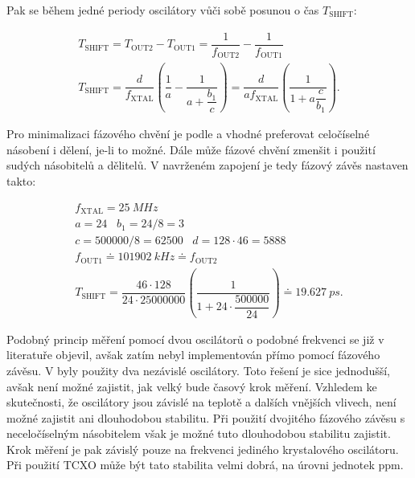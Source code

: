 Pak se během jedné periody oscilátory vůči sobě posunou o čas $T_\textrm{SHIFT}$:

\begin{equation}
\begin{gathered}
T_\mathrm{SHIFT}=T_\mathrm{OUT2}-T_\mathrm{OUT1}=\dfrac{1}{f_\mathrm{OUT2}} - \dfrac{1}{f_\mathrm{OUT1}} \\
T_\mathrm{SHIFT}=\dfrac{d}{f_\mathrm{XTAL}} \left(\dfrac{1}{a} - \dfrac{1}{a+\dfrac{b_1}{c}}\right) = \dfrac{d}{a f_\mathrm{XTAL}} \left(\dfrac{1}{1+a\dfrac{c}{b_1}}\right).
\end{gathered}
\label{equation_tshift}
\end{equation}

Pro minimalizaci fázového chvění je podle \cite{Si5351datasheet} a \cite{Si5351applicationnote} vhodné preferovat celočíselné násobení i dělení, je-li to možné. Dále může fázové chvění zmenšit i použití sudých násobitelů a dělitelů. V navrženém zapojení je tedy fázový závěs nastaven takto:

\begin{equation}
\begin{gathered}
f_\mathrm{XTAL}=\SI{25}{MHz} \\
a=24 \;\;\; b_1=24/8=3 \\
c=500000/8=62500 \;\;\; d=128 \cdot 46=5888 \\
f_\mathrm{OUT1} \doteq \SI{101902}{kHz} \doteq f_\mathrm{OUT2} \\
T_\mathrm{SHIFT} = \dfrac{46 \cdot 128}{24 \cdot 25000000} \left(\dfrac{1}{1+24 \cdot \dfrac{500000}{24}}\right) \doteq \SI{19.627}{ps}.
\end{gathered}
\end{equation}

Podobný princip měření pomocí dvou oscilátorů o podobné frekvenci se již v literatuře objevil, avšak zatím nebyl implementován přímo pomocí fázového závěsu. V \cite{vernierreflectometer} byly použity dva nezávislé oscilátory. Toto řešení je sice jednodušší, avšak není možné zajistit, jak velký bude časový krok měření. Vzhledem ke skutečnosti, že oscilátory jsou závislé na teplotě a dalších vnějších vlivech, není možné zajistit ani dlouhodobou stabilitu. Při použití dvojitého fázového závěsu s neceločíselným násobitelem však je možné tuto dlouhodobou stabilitu zajistit. Krok měření je pak závislý pouze na frekvenci jediného krystalového oscilátoru. Při použití \acrshort{TCXO} může být tato stabilita velmi dobrá, na úrovni jednotek \si{ppm}.

